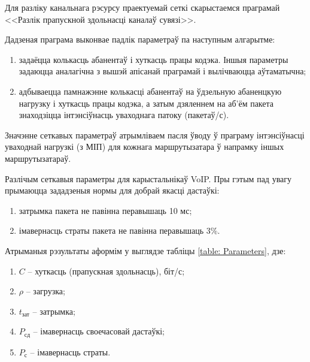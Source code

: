 Для разліку канальнага рэсурсу праектуемай сеткі скарыстаемся
праграмай <<Разлік прапускной здольнасці каналаў сувязі>>.

Дадзеная праграма выконвае падлік параметраў па наступным
алгарытме:
\begin{enumerate}
    \item задаёцца колькасць абанентаў і хуткасць працы кодэка.
          Іншыя параметры задаюцца аналагічна з вышэй апісанай
          праграмай і вылічваюцца аўтаматычна;
    \item адбываецца памнажэнне колькасці абанентаў на ўдзельную
          абаненцкую нагрузку і хуткасць працы кодэка, а затым
          дзяленнем на аб'ём пакета знаходзіцца інтэнсіўнасць
          уваходнага патоку (пакетаў/с).
\end{enumerate}

Значэнне сеткавых параметраў атрымліваем пасля ўводу ў праграму
інтэнсіўнасці уваходнай нагрузкі (з МІП) для кожнага маршрутызатара
ў напрамку іншых маршрутызатараў.

Разлічым сеткавыя параметры для карыстальнікаў VoIP. Пры гэтым пад
увагу прымаюцца зададзеныя нормы для добрай якасці дастаўкі:
\begin{enumerate}
    \item затрымка пакета не павінна перавышаць 10 мс;
    \item імавернасць страты пакета не павінна перавышаць 3\%.
\end{enumerate}

Атрыманыя рэзультаты аформім у выглядзе табліцы
\ref{table: Parameters}, дзе:
\begin{enumerate}
    \item $C$ -- хуткасць (прапускная здольнасць), біт/с;
    \item $\rho$ -- загрузка;
    \item $t_{\text{зат}}$ -- затрымка;
    \item $P_{\text{сд}}$ -- імавернасць своечасовай дастаўкі;
    \item $P_{\text{с}}$ -- імавернасць страты.
\end{enumerate}

